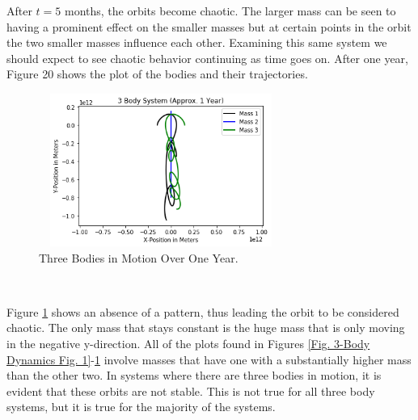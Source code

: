 \documentclass[twocolumn]{article}
\begin{document}
\par \noindent
After $t=5$ months, the orbits become chaotic. The larger mass can be seen to having a prominent effect on the smaller masses but at certain points in the orbit the two smaller masses influence each other. Examining this same system we should expect to see chaotic behavior continuing as time goes on. After one year, Figure 20 shows the plot of the bodies and their trajectories.
\begin{figure}[h]
    \centering
    \includegraphics[width=8cm, height=5cm]{Figures/3-Body Dynamics (8).png}
    \caption{\small{Three Bodies in Motion Over One Year.}}
    \label{Fig. 3-Body Dynamics Fig. 8}
\end{figure}\
\par \noindent
Figure \ref{Fig. 3-Body Dynamics Fig. 8} shows an absence of a pattern, thus leading the orbit to be considered chaotic. The only mass that stays constant is the huge mass that is only moving in the negative y-direction. All of the plots found in Figures \ref{Fig. 3-Body Dynamics Fig. 1}-\ref{Fig. 3-Body Dynamics Fig. 8} involve masses that have one with a substantially higher mass than the other two. In systems where there are three bodies in motion, it is evident that these orbits are not stable. This is not true for all three body systems, but it is true for the majority of the systems. 
\end{document}
